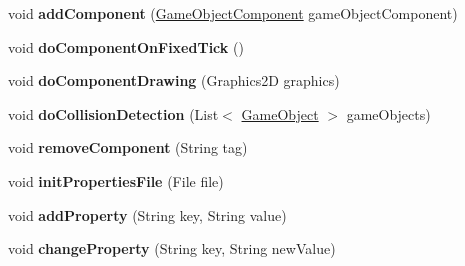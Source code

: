 \begin{DoxyCompactItemize}
void {\bfseries add\+Component} (\mbox{\hyperlink{classde_1_1me_1_1edgelord_1_1sjgl_1_1gameobject_1_1_game_object_component}{Game\+Object\+Component}} game\+Object\+Component)
\item 
\mbox{\label{classde_1_1me_1_1edgelord_1_1sjgl_1_1gameobject_1_1_game_object_aa8feb580a59bd809dd59ccf535ae2dc2}} 
void {\bfseries do\+Component\+On\+Fixed\+Tick} ()
\item 
\mbox{\label{classde_1_1me_1_1edgelord_1_1sjgl_1_1gameobject_1_1_game_object_a3e6aeef784849a7af87891f8d1a8456a}} 
void {\bfseries do\+Component\+Drawing} (Graphics2D graphics)
\item 
\mbox{\label{classde_1_1me_1_1edgelord_1_1sjgl_1_1gameobject_1_1_game_object_a8a4bba6bae72ce4258065457b173b8ed}} 
void {\bfseries do\+Collision\+Detection} (List$<$ \mbox{\hyperlink{classde_1_1me_1_1edgelord_1_1sjgl_1_1gameobject_1_1_game_object}{Game\+Object}} $>$ game\+Objects)
\item 
\mbox{\label{classde_1_1me_1_1edgelord_1_1sjgl_1_1gameobject_1_1_game_object_a1d7c8c571a5d3eecf47bac2bb042829e}} 
void {\bfseries remove\+Component} (String tag)
\item 
\mbox{\label{classde_1_1me_1_1edgelord_1_1sjgl_1_1gameobject_1_1_game_object_a918d929152aa4344b32d6ad47afd764d}} 
void {\bfseries init\+Properties\+File} (File file)
\item 
\mbox{\label{classde_1_1me_1_1edgelord_1_1sjgl_1_1gameobject_1_1_game_object_a61b0d6ebf7446865f0d94b46025d4117}} 
void {\bfseries add\+Property} (String key, String value)
\item 
\mbox{\label{classde_1_1me_1_1edgelord_1_1sjgl_1_1gameobject_1_1_game_object_af1d74ef479c70ea4a855380bfef522cb}} 
void {\bfseries change\+Property} (String key, String new\+Value)
\item 

\end{DoxyCompactItemize}
